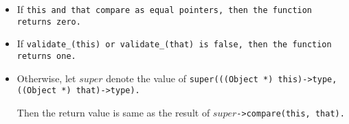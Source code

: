 \begin{itemize}[nosep]

\item If \tt{this} and \tt{that} compare as
equal pointers, then the function returns zero.

\item If \tt{validate_(this)} or \tt{validate_(that)}
is \tt{false}, then the function returns one.

\item Otherwise, let $super$ denote the value of
\tt{super(((Object *) this)->type, ((Object *) that)->type)}.

Then the return value is same as the result of $super$\tt{->compare(this, that)}.

\end{itemize}

